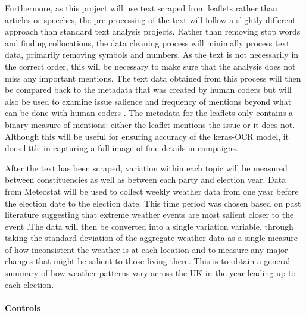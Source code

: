 \documentclass[preprint]{elsarticle} %
\begin{document}
Furthermore, as this project will use text scraped from leaflets rather than articles or speeches, the pre-processing of the text will follow a slightly different approach than standard text analysis projects. Rather than removing stop words and finding collocations, the data cleaning process will minimally process text data, primarily removing symbols and numbers. As the text is not necessarily in the correct order, this will be necessary to make sure that the analysis does not miss any important mentions. The text data obtained from this process will then be compared back to the metadata that was created by human coders but will also be used to examine issue salience and frequency of mentions beyond what can be done with human coders \citep{trummParliamentaryCandidatesTheir2023a}. The metadata for the leaflets only contains a binary measure of mentions: either the leaflet mentions the issue or it does not. Although this will be useful for ensuring accuracy of the keras-OCR model, it does little in capturing a full image of fine details in campaigns. 
 


After the text has been scraped, variation within each topic will be measured between constituencies as well as between each party and election year. Data from Meteostat \citep{MeteostatPyPI} will be used to collect weekly weather data from one year before the election date to the election date. This time period was chosen based on past literature suggesting that extreme weather events are most salient closer to the event \citep{viscontiEffectDifferentExtreme2024}.The data will then be converted into a single variation variable, through taking the standard deviation of the aggregate weather data as a single measure of how inconsistent the weather is at each location and to measure any major changes that might be salient to those living there. This is to obtain a general summary of how weather patterns vary across the UK in the year leading up to each election.


\paragraph{Controls}
\end{document}
